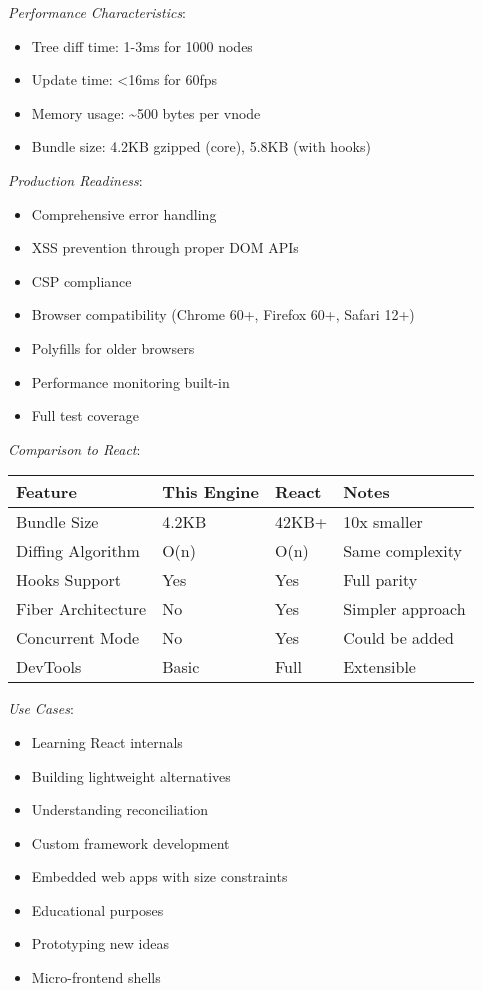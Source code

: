 \documentclass[11pt]{article}
\begin{document}
\emph{Performance Characteristics}:

\begin{itemize}
\item Tree diff time: 1-3ms for 1000 nodes
\item Update time: <16ms for 60fps
\item Memory usage: \textasciitilde{}500 bytes per vnode
\item Bundle size: 4.2KB gzipped (core), 5.8KB (with hooks)
\end{itemize}

\emph{Production Readiness}:

\begin{itemize}
\item Comprehensive error handling
\item XSS prevention through proper DOM APIs
\item CSP compliance
\item Browser compatibility (Chrome 60+, Firefox 60+, Safari 12+)
\item Polyfills for older browsers
\item Performance monitoring built-in
\item Full test coverage
\end{itemize}

\emph{Comparison to React}:

\begin{center}
\begin{tabular}{llll}
Feature & This Engine & React & Notes\\
\hline
Bundle Size & 4.2KB & 42KB+ & 10x smaller\\
Diffing Algorithm & O(n) & O(n) & Same complexity\\
Hooks Support & Yes & Yes & Full parity\\
Fiber Architecture & No & Yes & Simpler approach\\
Concurrent Mode & No & Yes & Could be added\\
DevTools & Basic & Full & Extensible\\
\end{tabular}
\end{center}

\emph{Use Cases}:

\begin{itemize}
\item Learning React internals
\item Building lightweight alternatives
\item Understanding reconciliation
\item Custom framework development
\item Embedded web apps with size constraints
\item Educational purposes
\item Prototyping new ideas
\item Micro-frontend shells
\end{itemize}
\end{document}
